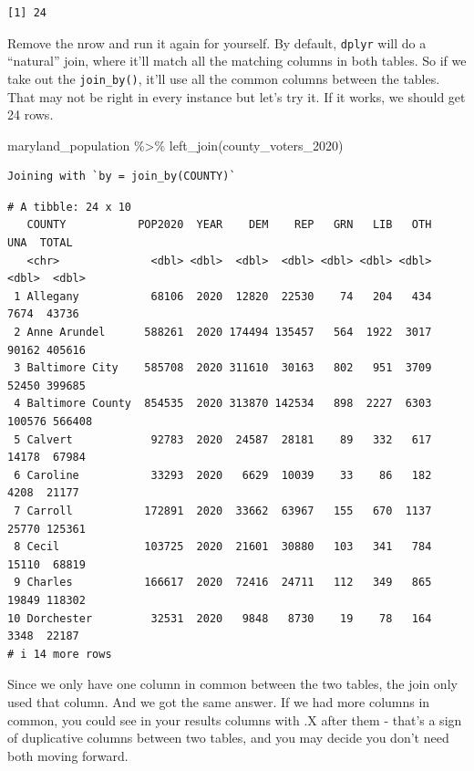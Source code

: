 \documentclass[
  letterpaper,
  DIV=11,
  numbers=noendperiod]{scrreprt}
\newenvironment{Shaded}{\begin{snugshade}}{\end{snugshade}}
\newcommand{\FunctionTok}[1]{\textcolor[rgb]{0.28,0.35,0.67}{#1}}
\newcommand{\NormalTok}[1]{\textcolor[rgb]{0.00,0.23,0.31}{#1}}
\newcommand{\SpecialCharTok}[1]{\textcolor[rgb]{0.37,0.37,0.37}{#1}}
\begin{document}
\begin{verbatim}
[1] 24
\end{verbatim}

Remove the nrow and run it again for yourself. By default,
\texttt{dplyr} will do a ``natural'' join, where it'll match all the
matching columns in both tables. So if we take out the
\texttt{join\_by()}, it'll use all the common columns between the
tables. That may not be right in every instance but let's try it. If it
works, we should get 24 rows.

\begin{Shaded}
\begin{Highlighting}[]
\NormalTok{maryland\_population }\SpecialCharTok{\%\textgreater{}\%} \FunctionTok{left\_join}\NormalTok{(county\_voters\_2020)}
\end{Highlighting}
\end{Shaded}

\begin{verbatim}
Joining with `by = join_by(COUNTY)`
\end{verbatim}

\begin{verbatim}
# A tibble: 24 x 10
   COUNTY           POP2020  YEAR    DEM    REP   GRN   LIB   OTH    UNA  TOTAL
   <chr>              <dbl> <dbl>  <dbl>  <dbl> <dbl> <dbl> <dbl>  <dbl>  <dbl>
 1 Allegany           68106  2020  12820  22530    74   204   434   7674  43736
 2 Anne Arundel      588261  2020 174494 135457   564  1922  3017  90162 405616
 3 Baltimore City    585708  2020 311610  30163   802   951  3709  52450 399685
 4 Baltimore County  854535  2020 313870 142534   898  2227  6303 100576 566408
 5 Calvert            92783  2020  24587  28181    89   332   617  14178  67984
 6 Caroline           33293  2020   6629  10039    33    86   182   4208  21177
 7 Carroll           172891  2020  33662  63967   155   670  1137  25770 125361
 8 Cecil             103725  2020  21601  30880   103   341   784  15110  68819
 9 Charles           166617  2020  72416  24711   112   349   865  19849 118302
10 Dorchester         32531  2020   9848   8730    19    78   164   3348  22187
# i 14 more rows
\end{verbatim}

Since we only have one column in common between the two tables, the join
only used that column. And we got the same answer. If we had more
columns in common, you could see in your results columns with .X after
them - that's a sign of duplicative columns between two tables, and you
may decide you don't need both moving forward.
\end{document}
